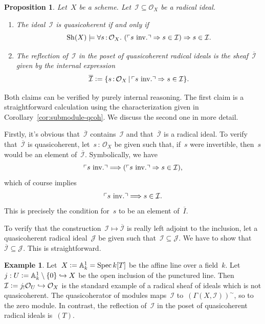 \documentclass[10pt,reqno,a4paper]{amsbook}
\makeatletter
\theoremstyle{definition}
\newtheorem{ex}[defn]{Example}
\theoremstyle{plain}
\newtheorem{prop}[defn]{Proposition}
\theoremstyle{remark}
\renewcommand{\AA}{\mathbb{A}}
\renewcommand{\O}{\mathcal{O}}
\newcommand{\I}{\mathcal{I}}
\newcommand{\J}{\mathcal{J}}
\newcommand{\Sh}{\mathrm{Sh}}
\DeclareMathOperator{\Spec}{Spec}
\newcommand{\?}{\,{:}\,}
\renewcommand{\_}{\mathpunct{.}\,}
\newcommand{\speak}[1]{\ulcorner\text{\textnormal{#1}}\urcorner}
\newcommand{\inv}{inv.\@}
\newcommand{\defeq}{\vcentcolon=}
\renewenvironment{proof}[1][\proofname]{\par
  \pushQED{\qed}%
  \normalfont \topsep6\p@\@plus6\p@\relax
  \trivlist
  \item[\hskip\labelsep
        \itshape
    #1\@addpunct{.}]\ignorespaces
}{%
  \popQED\endtrivlist\@endpefalse
}
\makeatother
\begin{document}
\begin{prop}\label{prop:quasicoherator-structure-sheaf}
Let~$X$ be a scheme. Let~$\I \subseteq \O_X$ be a radical ideal.
\begin{enumerate}
\item The ideal~$\I$ is quasicoherent if and only if
\[ \Sh(X) \models \forall s\?\O_X\_ (\speak{$s$ \inv} \Rightarrow s\in\I)
\Rightarrow s\in\I. \]
\item The reflection of~$\I$ in the poset of quasicoherent radical ideals is
the sheaf~$\overline{\I}$ given by the internal expression
\[ \overline{\I} \defeq \{ s\?\O_X \,|\, \speak{$s$ \inv} \Rightarrow s\in\I
\}. \]
\end{enumerate}
\end{prop}
\begin{proof}Both claims can be verified by purely internal reasoning. The
first claim is a straightforward calculation using the characterization given in
Corollary~\ref{cor:submodule-qcoh}. We discuss the second one in more detail.

Firstly, it's obvious that~$\overline{\I}$ contains~$\I$ and
that~$\overline{\I}$ is a radical ideal. To verify that~$\overline{\I}$ is
quasicoherent, let~$s\?\O_X$ be given such that, if~$s$ were invertible,
then~$s$ would be an element of~$\overline{\I}$. Symbolically, we have
\[ \speak{$s$ \inv} \Longrightarrow (\speak{$s$ \inv} \Rightarrow s\in\I), \]
which of course implies
\[ \speak{$s$ \inv} \Longrightarrow s\in\I. \]
This is precisely the condition for~$s$ to be an element of~$\overline{I}$.

To verify that the construction~$\I \mapsto \overline{\I}$ is really left
adjoint to the inclusion, let a quasicoherent radical ideal~$\J$ be given such
that~$\I \subseteq \J$. We have to show that~$\overline{\I} \subseteq \J$. This
is straightforward.
\end{proof}

\begin{ex}\label{ex:quasicoherator-of-ideals}
Let~$X \defeq \AA^1_k = \Spec k[T]$ be the affine line over a field~$k$.
Let~$j : U \defeq \AA^1_k \setminus \{ 0 \} \hookrightarrow X$ be the open inclusion
of the punctured line. Then~$\I \defeq j_! \O_U \hookrightarrow
\O_X$ is the standard example of a radical sheaf of ideals which is not
quasicoherent. The quasicoherator of modules maps~$\I$
to~$(\Gamma(X,\I))^\sim$, so to the zero module. In contrast, the reflection
of~$\I$ in the poset of quasicoherent radical ideals is~$(T)$.
\end{ex}
\end{document}
